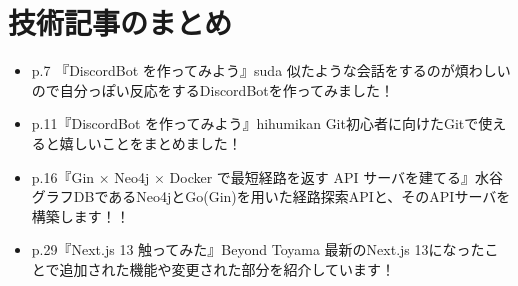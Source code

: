 \chapter{技術記事のまとめ}

\begin{tcolorbox}[title=お品書き]
  \begin{itemize}
    \item p.7 『DiscordBot を作ってみよう』suda
          似たような会話をするのが煩わしいので自分っぽい反応をするDiscordBotを作ってみました！
    \item p.11『DiscordBot を作ってみよう』hihumikan
          Git初心者に向けたGitで使えると嬉しいことをまとめました！
    \item p.16『Gin × Neo4j × Docker で最短経路を返す API サーバを建てる』水谷
          グラフDBであるNeo4jとGo(Gin)を用いた経路探索APIと、そのAPIサーバを構築します！！
    \item p.29『Next.js 13 触ってみた』Beyond Toyama
          最新のNext.js 13になったことで追加された機能や変更された部分を紹介しています！
  \end{itemize} 
\end{tcolorbox}

